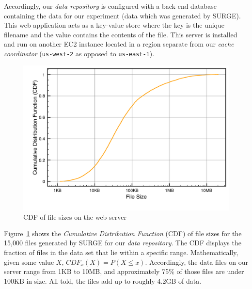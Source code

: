 Accordingly, our \emph{data repository} is configured with a back-end database
containing the data for our experiment (data which was generated by SURGE).
This web application acts as a key-value store where the key is the unique
filename and the value contains the contents of the file. This server is
installed and run on another EC2 instance located in a region separate from our
\emph{cache coordinator} ({\tt us-west-2} as opposed to {\tt us-east-1}).

\begin{figure}
\begin{center}
\includegraphics[scale=0.5]{figures/hierarchy-data-cdf.pdf}
\end{center}
\caption{CDF of file sizes on the web server}
\label{fig:file-cdf}
\end{figure}

Figure~\ref{fig:file-cdf} shows the \emph{Cumulative Distribution Function}
(CDF) of file sizes for the 15,000 files generated by SURGE for our \emph{data
repository}. The CDF displays the fraction of files in the data set that lie
within a specific range. Mathematically, given some value $X$, $CDF_x(X) = P(X
\leq x)$. Accordingly, the data files on our server range from 1KB to 10MB, and
approximately 75\% of those files are under 100KB in size. All told, the files
add up to roughly 4.2GB of data.

